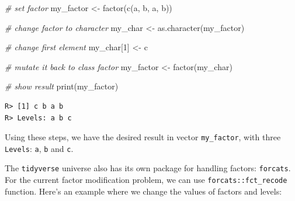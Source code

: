 \documentclass[
  12pt,
]{book}
\newenvironment{Shaded}{\begin{snugshade}}{\end{snugshade}}
\newcommand{\CommentTok}[1]{\textcolor[rgb]{0.37,0.37,0.37}{\textit{#1}}}
\newcommand{\DecValTok}[1]{\textcolor[rgb]{0.06,0.06,0.06}{#1}}
\newcommand{\FunctionTok}[1]{\textcolor[rgb]{0,0,0}{#1}}
\newcommand{\NormalTok}[1]{#1}
\newcommand{\OtherTok}[1]{\textcolor[rgb]{0.37,0.37,0.37}{#1}}
\newcommand{\StringTok}[1]{\textcolor[rgb]{0.5,0.5,0.5}{#1}}
\begin{document}
\begin{Shaded}
\begin{Highlighting}[]
\CommentTok{\# set factor}
\NormalTok{my\_factor }\OtherTok{\textless{}{-}} \FunctionTok{factor}\NormalTok{(}\FunctionTok{c}\NormalTok{(}\StringTok{\textquotesingle{}a\textquotesingle{}}\NormalTok{, }\StringTok{\textquotesingle{}b\textquotesingle{}}\NormalTok{, }\StringTok{\textquotesingle{}a\textquotesingle{}}\NormalTok{, }\StringTok{\textquotesingle{}b\textquotesingle{}}\NormalTok{))}

\CommentTok{\# change factor to character}
\NormalTok{my\_char }\OtherTok{\textless{}{-}} \FunctionTok{as.character}\NormalTok{(my\_factor)}

\CommentTok{\# change first element}
\NormalTok{my\_char[}\DecValTok{1}\NormalTok{] }\OtherTok{\textless{}{-}} \StringTok{\textquotesingle{}c\textquotesingle{}}

\CommentTok{\# mutate it back to class factor}
\NormalTok{my\_factor }\OtherTok{\textless{}{-}} \FunctionTok{factor}\NormalTok{(my\_char)}

\CommentTok{\# show result}
\FunctionTok{print}\NormalTok{(my\_factor)}
\end{Highlighting}
\end{Shaded}

\begin{verbatim}
R> [1] c b a b
R> Levels: a b c
\end{verbatim}

Using these steps, we have the desired result in vector \texttt{my\_factor}, with three \texttt{Levels}: \texttt{a}, \texttt{b} and \texttt{c}.

The \texttt{tidyverse} universe also has its own package for handling factors: \texttt{forcats}. For the current factor modification problem, we can use \texttt{forcats::fct\_recode} function. Here's an example where we change the values of factors and levels: 
\end{document}
